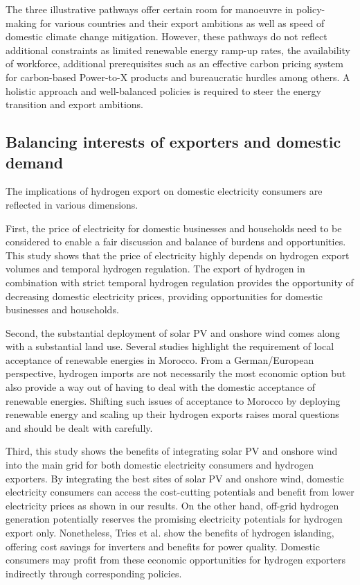 The three illustrative pathways offer certain room for manoeuvre in policy-making for various countries and their export ambitions as well as speed of domestic climate change mitigation. However, these pathways do not reflect additional constraints as limited renewable energy ramp-up rates, the availability of workforce, additional prerequisites such as an effective carbon pricing system for carbon-based Power-to-X products and bureaucratic hurdles among others. A holistic approach and well-balanced policies is required to steer the energy transition and export ambitions.


\subsection*{Balancing interests of exporters and domestic demand}
\label{subsec:balancedinterests}
The implications of hydrogen export on domestic electricity consumers are reflected in various dimensions. 

First, the price of electricity for domestic businesses and households need to be considered to enable a fair discussion and balance of burdens and opportunities. This study shows that the price of electricity highly depends on hydrogen export volumes and temporal hydrogen regulation. The export of hydrogen in combination with strict temporal hydrogen regulation provides the opportunity of decreasing domestic electricity prices, providing opportunities for domestic businesses and households.

Second, the substantial deployment of solar PV and onshore wind comes along with a substantial land use. Several studies \cite{Terrapon-Pfaff2019, Hanger2016} highlight the requirement of local acceptance of renewable energies in Morocco. From a German/European perspective, hydrogen imports are not necessarily the most economic option \cite{Merten2023} but also provide a way out of having to deal with the domestic acceptance of renewable energies.
Shifting such issues of acceptance to Morocco by deploying renewable energy and scaling up their hydrogen exports raises moral questions and should be dealt with carefully. %

Third, this study shows the benefits of integrating solar PV and onshore wind into the main grid for both domestic electricity consumers and hydrogen exporters. By integrating the best sites of solar PV and onshore wind, domestic electricity consumers can access the cost-cutting potentials and benefit from lower electricity prices as shown in our results. On the other hand, off-grid hydrogen generation potentially reserves the promising electricity potentials for hydrogen export only. Nonetheless, Tries et al.\cite{Tries2023b} show the benefits of hydrogen islanding, offering cost savings for inverters and benefits for power quality. Domestic consumers may profit from these economic opportunities for hydrogen exporters indirectly through corresponding policies.


